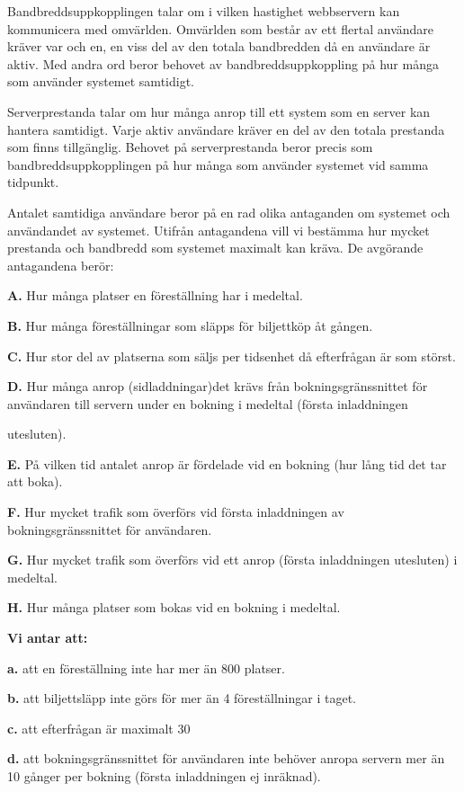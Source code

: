 \documentclass[a4paper, twoside, 11pt, titlepage]{article}
\begin{document}
	Bandbreddsuppkopplingen talar om i vilken hastighet webbservern kan kommunicera med omvärlden. Omvärlden som består av ett flertal användare kräver var och en, en viss del av den totala bandbredden då en användare är aktiv. Med andra ord beror behovet av bandbreddsuppkoppling på hur många som använder systemet samtidigt.

	Serverprestanda talar om hur många anrop till ett system som en server kan hantera samtidigt. Varje aktiv användare kräver en del av den totala prestanda som finns tillgänglig. Behovet på serverprestanda beror precis som bandbreddsuppkopplingen på hur många som använder systemet vid samma tidpunkt.

	Antalet samtidiga användare beror på en rad olika antaganden om systemet och användandet av systemet. Utifrån antagandena vill vi bestämma hur mycket prestanda och bandbredd som systemet maximalt kan kräva. De avgörande antagandena berör:

	\textbf{A.} Hur många platser en föreställning har i medeltal.

	\textbf{B.} Hur många föreställningar som släpps för biljettköp åt gången.

	\textbf{C.} Hur stor del av platserna som säljs per tidsenhet då efterfrågan är som störst.

	\textbf{D.} Hur många anrop (sidladdningar)det krävs från bokningsgränssnittet för användaren till servern under en bokning i medeltal (första inladdningen 

	utesluten).

	\textbf{E.} På vilken tid antalet anrop är fördelade vid en bokning (hur lång tid det tar att boka).

	\textbf{F.} Hur mycket trafik som överförs vid första inladdningen av bokningsgränssnittet för användaren.

	\textbf{G.} Hur mycket trafik som överförs vid ett anrop (första inladdningen utesluten) i medeltal.

	\textbf{H.} Hur många platser som bokas vid en bokning i medeltal.

	\textbf{Vi antar att:}

	\textbf{a.} att en föreställning inte har mer än 800 platser.

	\textbf{b.} att biljettsläpp inte görs för mer än 4 föreställningar i taget.

	\textbf{c.} att efterfrågan är maximalt 30%

	\textbf{d.} att bokningsgränssnittet för användaren inte behöver anropa servern mer än 10 gånger per bokning (första inladdningen ej inräknad).
\end{document}

